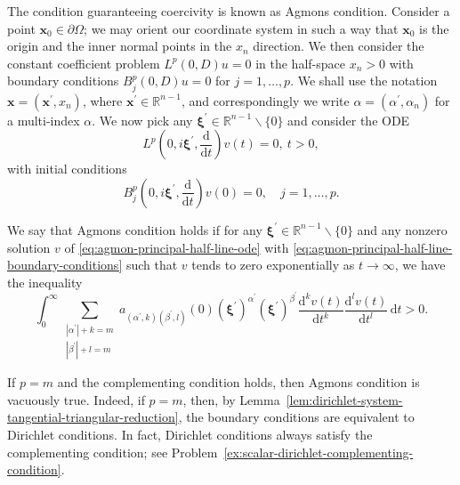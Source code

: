 The condition guaranteeing coercivity is known as Agmon\textquotesingle s condition. Consider a point $\bm{x}_0\in\partial\Omega$; we may orient our coordinate system in such a way that $\bm{x}_0$ is the origin and the inner normal points in the $x_n$ direction. We then consider the constant coefficient problem $L^p(0,D)u=0$ in the half-space $x_n>0$ with boundary conditions $B_j^p(0,D)u=0$ for $j=1,\ldots,p$. We shall use the notation $\bm{x}=(\bm{x}^{\prime},x_n)$, where $\bm{x}^{\prime}\in\mathbb{R}^{n-1}$, and correspondingly we write $\alpha=(\alpha^{\prime},\alpha_n)$ for a multi-index $\alpha$. We now pick any $\bm{\xi}^{\prime}\in\mathbb{R}^{n-1}\backslash\{0\}$ and consider the ODE
\begin{equation}\label{eq:agmon-principal-half-line-ode}
L^p\left(0,i\bm{\xi}^{\prime},\frac{\mathrm{d}}{\mathrm{d}t}\right)v(t)=0,\ t>0,
\end{equation}
with initial conditions
\begin{equation}\label{eq:agmon-principal-half-line-boundary-conditions}
B_j^p\left(0,i\bm{\xi}^{\prime},\frac{\mathrm{d}}{\mathrm{d}t}\right)v(0)=0,\quad j=1,\ldots,p.
\end{equation}


\begin{Definition}
\label{def:agmon-decaying-half-line-positivity}
We say that Agmon\textquotesingle s condition holds if for any $\bm{\xi}^{\prime}\in\mathbb{R}^{n-1}\backslash\{0\}$ and any nonzero solution $v$ of \eqref{eq:agmon-principal-half-line-ode} with \eqref{eq:agmon-principal-half-line-boundary-conditions} such that $v$ tends to zero exponentially as $t\to\infty$, we have the inequality
\begin{equation}\label{eq:agmon-decaying-principal-half-line-positivity}
\int_0^\infty\sum_{\substack{|\alpha^{\prime}|+k=m\\|\beta^{\prime}|+l=m}}a_{(\alpha^{\prime},k)(\beta^{\prime},l)}(0)(\bm{\xi}^{\prime})^{\alpha^{\prime}}(\bm{\xi}^{\prime})^{\beta^{\prime}}\frac{\mathrm{d}^kv(t)}{\mathrm{d}t^k}\frac{\mathrm{d}^lv(t)}{\mathrm{d}t^l}\,\mathrm{d}t>0.
\end{equation}

\end{Definition}

\begin{Remark}
\label{rem:agmon-dirichlet-vacuity}
If $p=m$ and the complementing condition holds, then Agmon\textquotesingle s condition is vacuously true. Indeed, if $p=m$, then, by Lemma~\ref{lem:dirichlet-system-tangential-triangular-reduction}, the boundary conditions are equivalent to Dirichlet conditions. In fact, Dirichlet conditions always satisfy the complementing condition; see Problem~\ref{ex:scalar-dirichlet-complementing-condition}.
\end{Remark}
